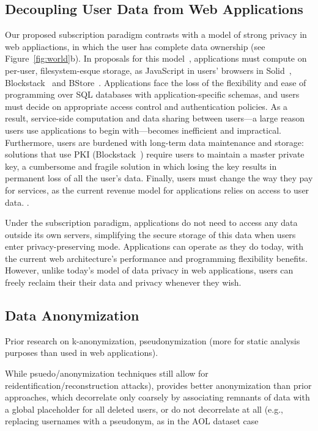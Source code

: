 \subsection{Decoupling User Data from Web Applications}
Our proposed subscription paradigm contrasts with a model of strong privacy in web appliactions, in
which the user has complete data ownership (see Figure~\ref{fig:world}b). In proposals for this
model~\cite{solid, amber, w5, blockstack, bstore}, applications must compute on per-user, filesystem-esque
storage, \eg as JavaScript in users' browsers in Solid~\cite{solid}, Blockstack~\cite{blockstack} and
BStore~\cite{bstore}. Applications face the loss of the flexibility and ease of programming over SQL
databases with application-specific schemas, and users must decide on appropriate access control and
authentication policies. As a result, service-side computation and data sharing between users---a
large reason users use applications to begin with---becomes inefficient and impractical.
%
Furthermore, users are burdened with long-term data maintenance and storage: solutions that use PKI
(\eg Blockstack~\cite{blockstack}) require users to maintain a
master private key, a cumbersome and fragile solution in which losing the key results in permanent
loss of all the user's data.
%
Finally, users must change the way they pay for services, as the current revenue model for
applications relies on access to user data.
.

Under the subscription paradigm, applications do not need to access any data outside its own
servers, simplifying the secure storage of this data when users enter privacy-preserving mode.
Applications can operate as they do today, with the current web architecture's performance and
programming flexibility benefits. However, unlike today's model of data privacy in web applications,
users can freely reclaim their their data and privacy whenever they wish.

\subsection{Data Anonymization}

Prior research on k-anonymization, pseudonymization (more for static analysis purposes than used in
web applications).

While psuedo/anonymization
techniques still allow for reidentification/reconstruction attacks), \name provides better
anonymization than prior approaches, which decorrelate only coarsely by associating remnants of data
with a global placeholder for all deleted users, or do not decorrelate at all (e.g., replacing
usernames with a pseudonym, as in the AOL dataset case~%

